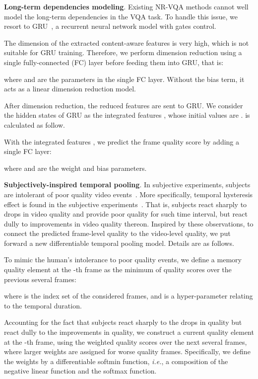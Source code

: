 \documentclass[twocolumn]{svjour3}          \smartqed  \usepackage{graphicx}
\begin{document}
\textbf{Long-term dependencies modeling}.
Existing NR-VQA methods cannot well model the long-term dependencies in the VQA task. 
To handle this issue, we resort to GRU~\citep{cho2014learning}, a recurrent neural network model with gates control. 

The dimension of the extracted content-aware features is very high, which is not suitable for GRU training. 
Therefore, we perform dimension reduction using a single fully-connected (FC) layer before feeding them into GRU,  that is:

where  and  are the parameters in the single FC layer. 
Without the bias term, it acts as a linear dimension reduction model.

After dimension reduction, the reduced features  are sent to GRU. 
We consider the hidden states of GRU as the integrated features , whose initial values are .   is calculated as follow.


With the integrated features , we predict the frame quality score  by adding a single FC layer:

where  and  are the weight and bias parameters.

\textbf{Subjectively-inspired temporal pooling}.
In subjective experiments, subjects are intolerant of poor quality video events~\citep{park2013video}. 
More specifically, temporal hysteresis effect is found in the subjective experiments~\citep{seshadrinathan2011temporal}.
That is, subjects react sharply to drops in video quality and provide poor quality for such time interval, but react dully to improvements in video quality thereon. 
Inspired by these observations, to connect the predicted frame-level quality to the video-level quality, we put forward a new differentiable temporal pooling model. Details are as follows.

To mimic the human's intolerance to poor quality events, we define a memory quality element  at the -th frame as the minimum of quality scores over the previous several frames:

where  is the index set of the considered frames, and  is a hyper-parameter relating to the temporal duration.

Accounting for the fact that subjects react sharply to the drops in quality but react dully to the improvements in quality, we construct a current quality element  at the -th frame, using the weighted quality scores over the next several frames, where larger weights are assigned for worse quality frames. 
Specifically, we define the weights  by a differentiable softmin function, \textit{i.e.}, a composition of the negative linear function and the softmax function.
\end{document}
